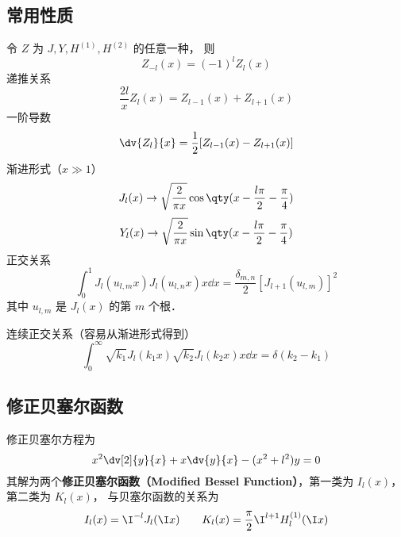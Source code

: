 \subsection{常用性质}
令 $Z$ 为 $J, Y, H^{(1)}, H^{(2)}$ 的任意一种， 则
\begin{equation}
Z_{-l}(x) = (-1)^l Z_l(x)
\end{equation}
递推关系
\begin{equation}
\frac{2l}{x} Z_l(x) = Z_{l -1}(x) + Z_{l+1}(x)
\end{equation}
一阶导数
\begin{equation}
\dv{Z_l}{x} = \frac12 [Z_{l  - 1}(x) - Z_{l +1}(x)]
\end{equation}
渐进形式（$x \gg 1$）
\begin{equation}
J_l(x) \to \sqrt{\frac{2}{\pi x}} \cos\qty(x - \frac{l\pi}{2} - \frac{\pi}{4})
\end{equation}
\begin{equation}
Y_l(x) \to \sqrt{\frac{2}{\pi x}} \sin\qty(x - \frac{l\pi}{2} - \frac{\pi}{4})
\end{equation}
正交关系
\begin{equation}
\int_0^1 J_l (u_{l ,m} x) J_l (u_{l ,n} x) x \dd{x} = \frac{\delta_{m,n}}{2}[J_{l + 1} (u_{l ,m})]^2
\end{equation}
其中 $u_{l, m}$ 是 $J_l(x)$ 的第 $m$ 个根．

连续正交关系（容易从渐进形式得到）
\begin{equation}
\int_0^\infty \sqrt{k_1} J_l (k_1 x) \sqrt{k_2}J_l (k_2 x) x \dd{x} = \delta(k_2 - k_1)
\end{equation}

\subsection{修正贝塞尔函数}
修正贝塞尔方程为
\begin{equation}
x^2 \dv[2]{y}{x} + x \dv{y}{x} - (x^2 + l ^2)y = 0
\end{equation}
其解为两个\textbf{修正贝塞尔函数（Modified Bessel Function）}，第一类为 $I_l(x)$，  第二类为 $K_l(x)$，  与贝塞尔函数的关系为
\begin{equation}\label{Bessel_eq2}
I_l(x) = \I^{-l} J_l(\I x)
\qquad
K_l(x) = \frac{\pi}{2} \I^{l  + 1} H_l ^{(1)}(\I x)
\end{equation}

